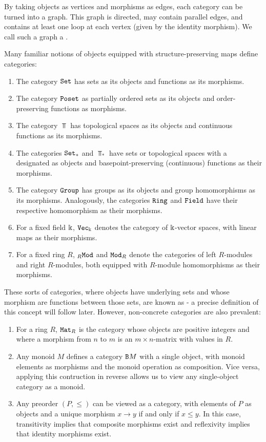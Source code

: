 By taking objects as vertices and morphisms as edges, each category can be turned into a graph. This graph is directed, may contain parallel edges, and contains at least one loop at each vertex (given by the identity morphism). We call such a graph a .
\begin{example}
	Many familiar notions of objects equipped with structure-preserving maps define categories:
	\begin{enumerate}
		\item The category $\texttt{Set}$ has sets as its objects and functions as its morphisms.
		\item The category $\texttt{Poset}$ as partially ordered sets as its objects and order-preserving functions as morphisms.
		\item The category $\Top$ has topological spaces as its objects and continuous functions as its morphisms.
		\item The categories $\texttt{Set}_*$ and $\Top_*$ have sets or topological spaces with a designated  as objects and basepoint-preserving (continuous) functions as their morphisms.
		\item The category $\texttt{Group}$ has groups as its objects and group homomorphisms as its morphisms. Analogously, the categories $\texttt{Ring}$ and $\texttt{Field}$ have their respective homomorphism as their morphisms.
		\item For a fixed field $\Bbbk$, $\texttt{Vec}_\Bbbk$ denotes the category of $\Bbbk$-vector spaces, with linear maps as their morphisms.
		\item For a fixed ring $R$, $_R \texttt{Mod}$ and $\texttt{Mod}_R$ denote the categories of left $R$-modules and right $R$-modules, both equipped with $R$-module homomorphisms as their morphisms.
	\end{enumerate}
\end{example}
These sorts of categories, where objects have underlying sets and whose morphism are functions between those sets, are known as  - a precise definition of this concept will follow later. However, non-concrete categories are also prevalent:
\begin{example}
	\begin{enumerate}
		\item For a ring $R$, $\texttt{Mat}_R$ is the category whose objects are positive integers and where a morphism from $n$ to $m$ is an $m \times n$-matrix with values in $R$.
		\item Any monoid $M$ defines a category $\texttt{B}M$ with a single object, with monoid elements as morphisms and the monoid operation as composition. Vice versa, applying this contruction in reverse allows us to view any single-object category as a monoid.
		\item Any preorder $(P, \leq)$ can be viewed as a category, with elements of $P$ as objects and a unique morphism $x \to y$ if and only if $x \leq y$. In this case, transitivity implies that composite morphisms exist and reflexivity implies that identity morphisms exist.
	\end{enumerate}
\end{example}
